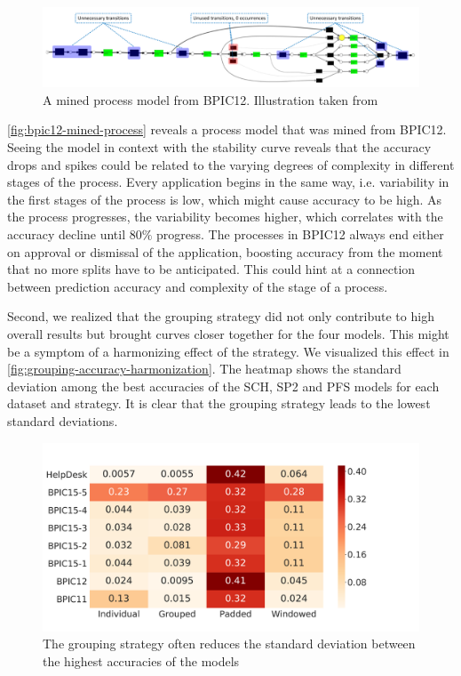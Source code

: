 \begin{figure}[!htb]
    \centering
    \begin{adjustbox}{center}
    \includegraphics[width=1.25\textwidth]{gfx/bpic12-mined-process.png}
    \end{adjustbox}
    \caption[A mined process model from BPIC12]{A mined process model from BPIC12. Illustration taken from~\cite{adriansyah2012mining}}
    \label{fig:bpic12-mined-process}
\end{figure}

\autoref{fig:bpic12-mined-process} reveals a process model that was mined from BPIC12.
Seeing the model in context with the stability curve reveals that the accuracy drops and spikes could be related to the varying degrees of complexity in different stages of the process.
Every application begins in the same way, i.e. variability in the first stages of the process is low, which might cause accuracy to be high.
As the process progresses, the variability becomes higher, which correlates with the accuracy decline until $80\%$ progress.
The processes in BPIC12 always end either on approval or dismissal of the application, boosting accuracy from the moment that no more splits have to be anticipated.
This could hint at a connection between prediction accuracy and complexity of the stage of a process.

Second, we realized that the grouping strategy did not only contribute to high overall results but brought curves closer together for the four models.
This might be a symptom of a harmonizing effect of the strategy.
We visualized this effect in \autoref{fig:grouping-accuracy-harmonization}.
The heatmap shows the standard deviation among the best accuracies of the SCH, SP2 and PFS models for each dataset and strategy.
It is clear that the grouping strategy leads to the lowest standard deviations.

\begin{figure}[!htb]
    \centering
    \includegraphics[width=\textwidth]{gfx/grouping-accuracy-harmonization.pdf}
    \caption[Batching strategy harmonizes top accuracies]{The grouping strategy often reduces the standard deviation between the highest accuracies of the models}
    \label{fig:grouping-accuracy-harmonization}
\end{figure}

